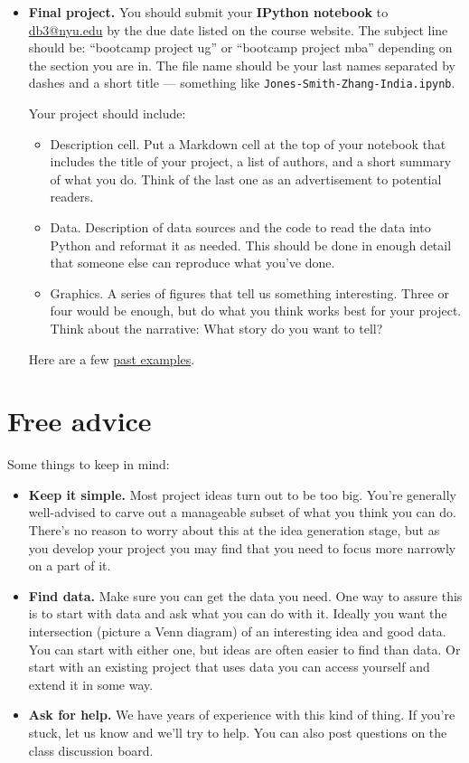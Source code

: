 \documentclass[11pt]{article}
\begin{document}
\begin{itemize}
\item {\bf Final project.}
You should submit your {\bf IPython notebook\/} to \href{mailto:db3@nyu.edu}{db3@nyu.edu}
by the due date listed on the course website.
The subject line should be:  ``bootcamp project ug'' or ``bootcamp project mba''
depending on the section you are in.
The file name should be your last names separated by dashes and a short title ---
something like {\tt Jones-Smith-Zhang-India.ipynb}.

Your project should include:
\begin{itemize}
\item Description cell.  Put a Markdown cell at the top of your notebook that
   includes the title of your project, a list of authors, and a short summary
  of what you do.  Think of the last one as an advertisement to potential readers.
\item Data.  Description of data sources and the code to read the data into Python
and reformat it as needed.
This should be done in enough detail that someone else can reproduce what you've done.
\item Graphics.  A series of figures that tell us something interesting.
Three or four would be enough, but do what you think works best for your project.
Think about the narrative:  What story do you want to tell?
\end{itemize}
Here are a few \href{https://github.com/DaveBackus/Data_Bootcamp/tree/master/Projects}
{past examples}.
\end{itemize}


\section*{Free advice}

Some things to keep in mind:
%
\begin{itemize}
\item {\bf Keep it simple.}
Most project ideas turn out to be too big.  You're generally well-advised
to carve out a manageable subset of what you think you can do.
There's no reason to worry about this at the idea generation stage,
but as you develop your project you may find that you need to focus
more narrowly on a part of it.

\item {\bf Find data.}  Make sure you can get the data you need.
One way to assure this is to start with data and ask what you can do with it.
Ideally you want the intersection (picture a Venn diagram) of an interesting
idea and good data.  You can start with either one, but ideas are often easier to
find than data.
Or start with an existing project that uses data you can access yourself
and extend it in some way.


\item {\bf Ask for help.}
We have years of experience with this kind of thing.
If you're stuck, let us know and we'll try to help.
You can also post questions on the class discussion board.

\end{itemize}
\end{document}
